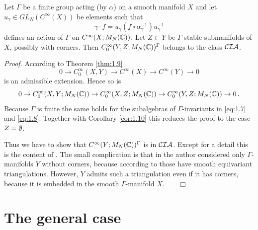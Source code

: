 \begin{thm}\label{thm:1.6}
Let $\Gamma$ be a finite group acting \textup{(}by $\alpha$\textup{)} 
on a smooth manifold $X$ and let $u_\gamma \in GL_N (C^\infty (X))$
be elements such that
\[
\gamma \cdot f = u_\gamma (f \circ \alpha_\gamma^{-1}) u_\gamma^{-1}
\]
defines an action of $\Gamma$ on $C^\infty (X ; M_N (\mathbb C))$.
Let $Z \subset Y$ be $\Gamma$-stable submanifolds of $X$, possibly
with corners. Then $C_0^\infty (Y,Z;M_N (\mathbb C))^\Gamma$ belongs
to the class $\mathcal{CIA}$.
\end{thm}
\emph{Proof.}
According to Theorem \ref{thm:1.9}
\begin{equation}\label{eq:1.7}
0 \to C_0^\infty (X,Y) \to C^\infty (X) \to C^\infty (Y) \to 0
\end{equation}
is an admissible extension. Hence so is
\begin{equation}\label{eq:1.8}
0 \to C_0^\infty (X,Y;M_N (\mathbb C )) \to C_0^\infty (X,Z;M_N (\mathbb C
)) \to C_0^\infty (Y,Z;M_N (\mathbb C )) \to 0 \,.
\end{equation}
Because $\Gamma$ is finite the same holds for the subalgebras of
$\Gamma$-invariants in \eqref{eq:1.7} and \eqref{eq:1.8}. Together
with Corollary \ref{cor:1.10} this reduces the proof to the case
$Z = \emptyset$.

Thus we have to show that $C^\infty (Y;M_N (\mathbb C ))^\Gamma$
is in $\mathcal{CIA}$. Except for a detail this is the content of
\cite[Theorem 6]{Sol1}. The small complication is that in \cite{Sol1}
the author considered only $\Gamma$-manifolds $Y$ without corners,
because according to \cite{Ill} those have smooth equivariant
triangulations. However, $Y$ admits such a triangulation even if it has
corners, because it is embedded in the smooth $\Gamma$-manifold $X.
\qquad \Box$
\vspace{4mm}



\section{The general case}
\label{sec:1.4}

